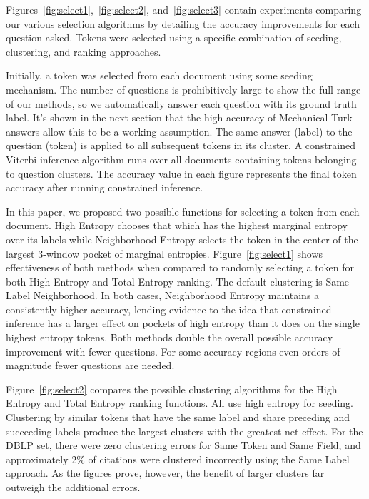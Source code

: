 Figures~\ref{fig:select1},~\ref{fig:select2}, and~\ref{fig:select3} contain experiments comparing our various selection algorithms by detailing the accuracy improvements for each question asked.  Tokens were selected using a specific combination of seeding, clustering, and ranking approaches.  

Initially, a token was selected from each document using some seeding mechanism.  The number of questions is prohibitively large to show the full range of our methods, so we automatically answer each question with its ground truth label.  It's shown in the next section that the high accuracy of Mechanical Turk answers allow this to be a working assumption.  The same answer (label) to the question (token) is applied to all subsequent tokens in its cluster.  A constrained Viterbi inference algorithm runs over all documents  containing tokens belonging to question clusters.  The accuracy value in each figure represents the final token accuracy after running constrained inference.

In this paper, we proposed two possible functions for selecting a token from each document.  High Entropy chooses that which has the highest marginal entropy over its labels while Neighborhood Entropy selects the token in the center of the largest 3-window pocket of marginal entropies.  Figure~\ref{fig:select1} shows effectiveness of both methods when compared to randomly selecting a token for both High Entropy and Total Entropy ranking.  The default clustering is Same Label Neighborhood.  In both cases, Neighborhood Entropy maintains a consistently higher accuracy, lending evidence to the idea that constrained inference has a larger effect on pockets of high entropy than it does on the single highest entropy tokens.  Both methods double the overall possible accuracy improvement with fewer questions.  For some accuracy regions even orders of magnitude fewer questions are needed.

Figure~\ref{fig:select2} compares the possible clustering algorithms for the High Entropy and Total Entropy ranking functions.  All use high entropy for seeding.  Clustering by similar tokens that have the same label and share preceding and succeeding labels produce the largest clusters with the greatest net effect.  For the DBLP set, there were zero clustering errors for Same Token and Same Field, and approximately 2\% of citations were clustered incorrectly using the Same Label approach.  As the figures prove, however, the benefit of larger clusters far outweigh the additional errors.

